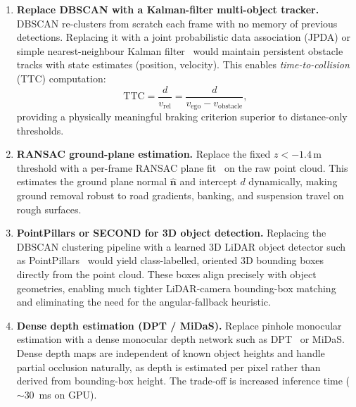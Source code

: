 \documentclass[12pt,a4paper]{article}
\begin{document}
\begin{enumerate}[label=\textbf{\arabic{enumi}.}, leftmargin=2.5em,
                  itemsep=6pt]

  \item \textbf{Replace DBSCAN with a Kalman-filter multi-object tracker.}
    DBSCAN re-clusters from scratch each frame with no memory of previous
    detections.  Replacing it with a joint probabilistic data association
    (JPDA) or simple nearest-neighbour Kalman filter~\cite{kalman1960new}
    would maintain persistent obstacle tracks with state estimates
    (position, velocity).  This enables \emph{time-to-collision} (TTC)
    computation:
    \begin{equation}
      \text{TTC} = \frac{d}{v_\text{rel}} =
                   \frac{d}{v_\text{ego} - v_\text{obstacle}},
      \label{eq:ttc}
    \end{equation}
    providing a physically meaningful braking criterion superior to
    distance-only thresholds.

  \item \textbf{RANSAC ground-plane estimation.}
    Replace the fixed $z < -1.4$\,m threshold with a per-frame RANSAC
    plane fit~\cite{fischler1981ransac} on the raw point cloud.  This
    estimates the ground plane normal $\hat{\mathbf{n}}$ and intercept $d$
    dynamically, making ground removal robust to road gradients, banking,
    and suspension travel on rough surfaces.

  \item \textbf{PointPillars or SECOND for 3D object detection.}
    Replacing the DBSCAN clustering pipeline with a learned 3D LiDAR object
    detector such as PointPillars~\cite{lang2019pointpillars} would yield
    class-labelled, oriented 3D bounding boxes directly from the point cloud.
    These boxes align precisely with object geometries, enabling much tighter
    LiDAR-camera bounding-box matching and eliminating the need for the
    angular-fallback heuristic.

  \item \textbf{Dense depth estimation (DPT / MiDaS).}
    Replace pinhole monocular estimation with a dense monocular depth network
    such as DPT~\cite{ranftl2021dpt} or MiDaS.  Dense depth maps are
    independent of known object heights and handle partial occlusion naturally,
    as depth is estimated per pixel rather than derived from bounding-box
    height.  The trade-off is increased inference time
    ($\sim$\SI{30}{\milli\second} on GPU).


\end{enumerate}
\end{document}
